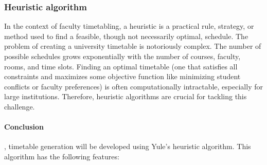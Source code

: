 \subsubsection{Heuristic algorithm}

In the context of faculty timetabling, a heuristic is a practical rule, strategy, or method used to find a feasible, though not necessarily optimal, schedule.
The problem of creating a university timetable is notoriously complex.
The number of possible schedules grows exponentially with the number of courses, faculty, rooms, and time slots.
Finding an optimal timetable (one that satisfies all constraints and maximizes some objective function like minimizing student conflicts or faculty preferences) is often computationally intractable, especially for large institutions.
Therefore, heuristic algorithms are crucial for tackling this challenge.

\paragraph{Conclusion}, timetable generation will be developed using Yule's \cite{Yule1969} heuristic algorithm. This algorithm has the following features:

